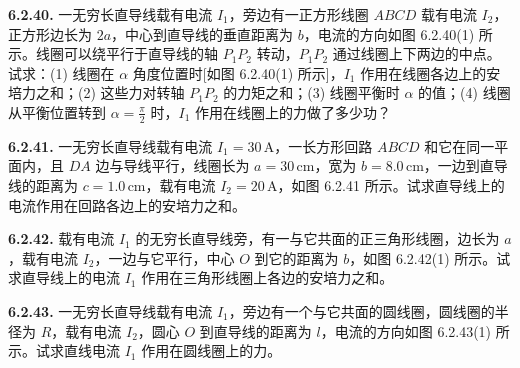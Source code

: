 \begin{center}
\end{center}

\vfill
\newpage

\textbf{6.2.40.} 一无穷长直导线载有电流 $I_{1}$，旁边有一正方形线圈 $ABCD$ 载有电流 $I_{2}$，正方形边长为 $2a$，中心到直导线的垂直距离为 $b$，电流的方向如图 6.2.40(1) 所示。线圈可以绕平行于直导线的轴 $P_{1}P_{2}$ 转动，$P_{1}P_{2}$ 通过线圈上下两边的中点。试求：(1) 线圈在 $\alpha$ 角度位置时[如图 6.2.40(1) 所示]，$I_{1}$ 作用在线圈各边上的安培力之和；(2) 这些力对转轴 $P_{1}P_{2}$ 的力矩之和；(3) 线圈平衡时 $\alpha$ 的值；(4) 线圈从平衡位置转到 $\displaystyle \alpha = \frac{\pi}{2}$ 时，$I_{1}$ 作用在线圈上的力做了多少功？

\begin{center}
\end{center}

\vfill
\newpage

\textbf{6.2.41.} 一无穷长直导线载有电流 $I_{1} = 30\,\mathrm{A}$，一长方形回路 $ABCD$ 和它在同一平面内，且 $DA$ 边与导线平行，线圈长为 $a = 30\,\mathrm{cm}$，宽为 $b = 8.0\,\mathrm{cm}$，一边到直导线的距离为 $c = 1.0\,\mathrm{cm}$，载有电流 $I_{2} = 20\,\mathrm{A}$，如图 6.2.41 所示。试求直导线上的电流作用在回路各边上的安培力之和。

\begin{center}
\end{center}

\vfill
\newpage

\textbf{6.2.42.} 载有电流 $I_{1}$ 的无穷长直导线旁，有一与它共面的正三角形线圈，边长为 $a$，载有电流 $I_{2}$，一边与它平行，中心 $O$ 到它的距离为 $b$，如图 6.2.42(1) 所示。试求直导线上的电流 $I_{1}$ 作用在三角形线圈上各边的安培力之和。

\begin{center}
\end{center}

\vfill
\newpage

\textbf{6.2.43.} 一无穷长直导线载有电流 $I_{1}$，旁边有一个与它共面的圆线圈，圆线圈的半径为 $R$，载有电流 $I_{2}$，圆心 $O$ 到直导线的距离为 $l$，电流的方向如图 6.2.43(1) 所示。试求直线电流 $I_{1}$ 作用在圆线圈上的力。

\begin{center}
  \begin{minipage}[b]{0.47\linewidth}
    \centering
  \end{minipage}\hfill
  \begin{minipage}[b]{0.47\linewidth}
    \centering
  \end{minipage}
\end{center}

